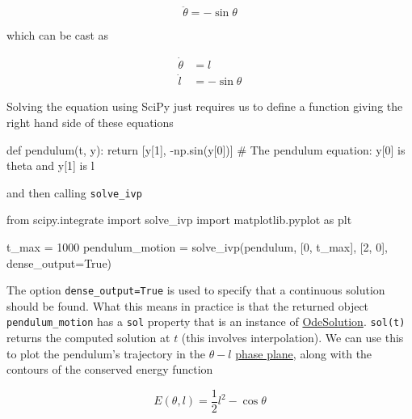 \documentclass[
  letterpaper,
  DIV=11,
  numbers=noendperiod]{scrreprt}
\newenvironment{Shaded}{\begin{snugshade}}{\end{snugshade}}
\newcommand{\CommentTok}[1]{\textcolor[rgb]{0.37,0.37,0.37}{#1}}
\newcommand{\ControlFlowTok}[1]{\textcolor[rgb]{0.00,0.23,0.31}{#1}}
\newcommand{\DecValTok}[1]{\textcolor[rgb]{0.68,0.00,0.00}{#1}}
\newcommand{\ImportTok}[1]{\textcolor[rgb]{0.00,0.46,0.62}{#1}}
\newcommand{\KeywordTok}[1]{\textcolor[rgb]{0.00,0.23,0.31}{#1}}
\newcommand{\NormalTok}[1]{\textcolor[rgb]{0.00,0.23,0.31}{#1}}
\newcommand{\OperatorTok}[1]{\textcolor[rgb]{0.37,0.37,0.37}{#1}}
\newcommand{\VariableTok}[1]{\textcolor[rgb]{0.07,0.07,0.07}{#1}}
\theoremstyle{definition}
\theoremstyle{remark}
\begin{document}
\[
\ddot \theta = -\sin\theta
\]

which can be cast as

\[
\begin{align}
\dot\theta &= l\\
\dot l &= -\sin\theta
\end{align}
\]

Solving the equation using SciPy just requires us to define a function
giving the right hand side of these equations

\begin{Shaded}
\begin{Highlighting}[]
\KeywordTok{def}\NormalTok{ pendulum(t, y): }\ControlFlowTok{return}\NormalTok{ [y[}\DecValTok{1}\NormalTok{], }\OperatorTok{{-}}\NormalTok{np.sin(y[}\DecValTok{0}\NormalTok{])]}
\CommentTok{\# The pendulum equation: y[0] is theta and y[1] is l}
\end{Highlighting}
\end{Shaded}

and then calling \texttt{solve\_ivp}

\begin{Shaded}
\begin{Highlighting}[]
\ImportTok{from}\NormalTok{ scipy.integrate }\ImportTok{import}\NormalTok{ solve\_ivp}
\ImportTok{import}\NormalTok{ matplotlib.pyplot }\ImportTok{as}\NormalTok{ plt}

\NormalTok{t\_max }\OperatorTok{=} \DecValTok{1000}
\NormalTok{pendulum\_motion }\OperatorTok{=}\NormalTok{ solve\_ivp(pendulum, [}\DecValTok{0}\NormalTok{, t\_max], [}\DecValTok{2}\NormalTok{, }\DecValTok{0}\NormalTok{], dense\_output}\OperatorTok{=}\VariableTok{True}\NormalTok{)}
\end{Highlighting}
\end{Shaded}

The option \texttt{dense\_output=True} is used to specify that a
continuous solution should be found. What this means in practice is that
the returned object \texttt{pendulum\_motion} has a \texttt{sol}
property that is an instance of
\href{https://docs.scipy.org/doc/scipy/reference/generated/scipy.integrate.OdeSolution.html\#scipy.integrate.OdeSolution}{OdeSolution}.
\texttt{sol(t)} returns the computed solution at \(t\) (this involves
interpolation). We can use this to plot the pendulum's trajectory in the
\(\theta- l\) \href{https://en.wikipedia.org/wiki/Phase_plane}{phase
plane}, along with the contours of the conserved energy function

\[
E(\theta, l) = \frac{1}{2}l^2 - \cos\theta
\]
\end{document}
